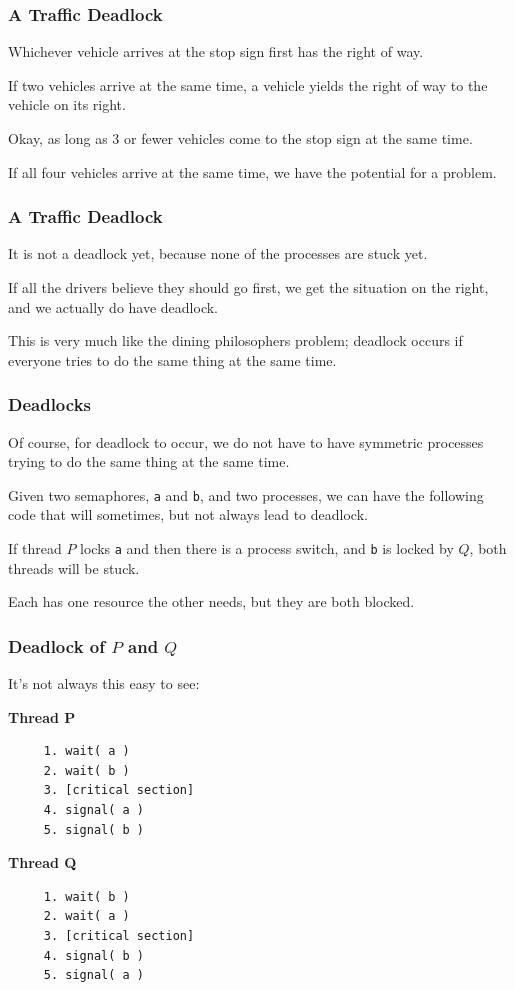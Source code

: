 \begin{frame}
\frametitle{A Traffic Deadlock}

Whichever vehicle arrives at the stop sign first has the right of way. 

If two vehicles arrive at the same time, a vehicle yields the right of way to the vehicle on its right.

Okay, as long as 3 or fewer vehicles come to the stop sign at the same time.

 If all four vehicles arrive at the same time, we have the potential for a problem. 
\end{frame}

\begin{frame}
\frametitle{A Traffic Deadlock}

It is not a deadlock yet, because none of the processes are stuck yet.

If all the drivers believe they should go first, we get the situation on the right, and we actually do have deadlock. 

This is very much like the dining philosophers problem; deadlock occurs if everyone tries to do the same thing at the same time.

\end{frame}

\begin{frame}
\frametitle{Deadlocks}

Of course, for deadlock to occur, we do not have to have symmetric processes trying to do the same thing at the same time. 

Given two semaphores, \texttt{a} and \texttt{b}, and two processes, we can have the following code that will sometimes, but not always lead to deadlock. 

If thread $P$ locks \texttt{a} and then there is a process switch, and \texttt{b} is locked by $Q$, both threads will be stuck. 

Each has one resource the other needs, but they are both blocked.


\end{frame}

\begin{frame}[fragile]
\frametitle{Deadlock of $P$ and $Q$}
It's not always this easy to see:


\begin{multicols}{2}
\textbf{Thread P}
  \begin{verbatim}
	 1. wait( a ) 
	 2. wait( b )
	 3. [critical section]
	 4. signal( a )
	 5. signal( b )
  \end{verbatim}
\columnbreak
\textbf{Thread Q}
  \begin{verbatim}
	 1. wait( b ) 
	 2. wait( a )
	 3. [critical section]
	 4. signal( b )
	 5. signal( a )
  \end{verbatim}
\end{multicols}

\end{frame}

